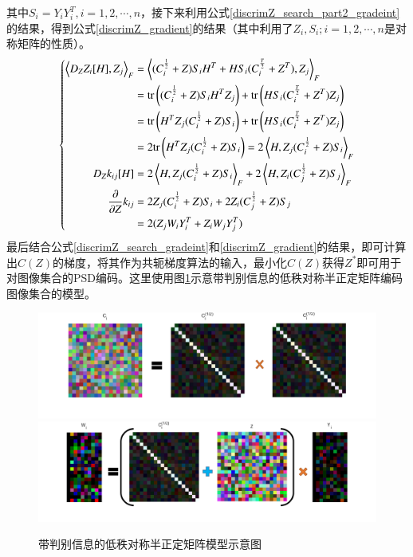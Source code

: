 其中$S_{i}=Y_{i}Y_{i}^{T},i=1,2,\cdots,n$，接下来利用公式\ref{discrimZ_search_part2_gradeint}的结果，得到公式\ref{discrimZ_gradient}的结果（其中利用了$Z_{i},S_{i};i=1,2,\cdots,n$是对称矩阵的性质）。
\begin{equation}
\label{discrimZ_gradient}
\left\{
\begin{split}
\left<D_{Z}Z_i[H],Z_j\right>_{F}&=\left<(C_{i}^{\frac{1}{2}}+Z)S_{i}H^{T}+HS_{i}(C_{i}^{\frac{T}{2}}+Z^{T}),Z_j\right>_{F}\\
&={\rm tr}\left((C_{i}^{\frac{1}{2}}+Z)S_{i}H^{T}Z_j\right)+{\rm tr}\left(HS_{i}(C_{i}^{\frac{T}{2}}+Z^{T})Z_j\right)\\
&={\rm tr}\left(H^{T}Z_j(C_{i}^{\frac{1}{2}}+Z)S_{i}\right)+{\rm tr}\left(HS_{i}(C_{i}^{\frac{T}{2}}+Z^{T})Z_j\right)\\
&=2{\rm tr}\left(H^{T}Z_j(C_{i}^{\frac{1}{2}}+Z)S_{i}\right)=2\left<H,Z_j(C_{i}^{\frac{1}{2}}+Z)S_{i}\right>_{F}\\
D_{Z}k_{ij}[H]&=2\left<H,Z_j(C_{i}^{\frac{1}{2}}+Z)S_{i}\right>_{F}+2\left<H,Z_i(C_{j}^{\frac{1}{2}}+Z)S_{j}\right>_{F}\\
\frac{\partial}{\partial Z}k_{ij}&=2Z_j(C_{i}^{\frac{1}{2}}+Z)S_{i}+2Z_i(C_{j}^{\frac{1}{2}}+Z)S_{j}\\
&=2(Z_{j}W_{i}Y_{i}^{T}+Z_{i}W_{j}Y_{j}^{T})
\end{split}
\right.
\end{equation}
最后结合公式\ref{discrimZ_search_gradeint}和\ref{discrimZ_gradient}的结果，即可计算出$C(Z)$的梯度，将其作为共轭梯度算法的输入，最小化$C(Z)$获得$Z^{*}$即可用于对图像集合的PSD编码。这里使用图\ref{fig:Discrim_LRPSD}示意带判别信息的低秩对称半正定矩阵编码图像集合的模型。
\begin{figure}[htb]
	\centering
      	{\includegraphics[width=\linewidth]{source/Discrim_LRPSD_sqrt.png}}
		{\includegraphics[width=\linewidth]{source/Discrim_LRPSD_W.png}}
	\caption{带判别信息的低秩对称半正定矩阵模型示意图}
	\label{fig:Discrim_LRPSD}
\end{figure}
